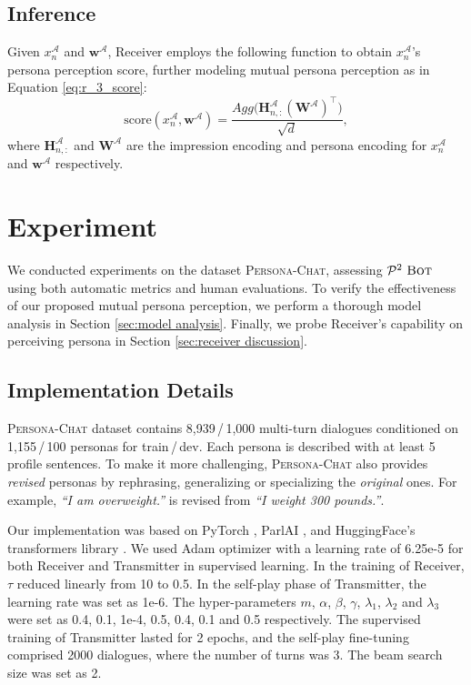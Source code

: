 \documentclass[11pt,a4paper]{article}
\begin{document}
\subsection{Inference}

Given $x^\mathcal{A}_{n}$ and $\mathbf{w}^{\mathcal{A}}$, Receiver employs the following function to obtain $x^\mathcal{A}_{n}$'s persona perception score, further modeling mutual persona perception as in Equation \ref{eq:r_3_score}:
\begin{equation}
    \text{score}(x^\mathcal{A}_{n},\mathbf{w}^{\mathcal{A}})=\frac{Agg\big(\mathbf{H}^\mathcal{A}_{n,:} ({\mathbf{W}^\mathcal{A}})^\top\big)}{\sqrt{d}},
\end{equation}
where $\mathbf{H}^\mathcal{A}_{n,:}$ and ${\mathbf{W}^\mathcal{A}}$ are the impression encoding and persona encoding for $x^\mathcal{A}_{n}$ and $\mathbf{w}^{\mathcal{A}}$ respectively.

\section{Experiment}

We conducted experiments on the dataset \textsc{Persona-Chat}, assessing $\mathcal{P}^2~\textsc{Bot}$ using both automatic metrics and human evaluations. 
To verify the effectiveness of our proposed mutual persona perception, we perform a thorough model analysis in Section \ref{sec:model analysis}. Finally, we probe Receiver's capability on perceiving persona in Section \ref{sec:receiver discussion}.

\subsection{Implementation Details}

\textsc{Persona-Chat} dataset contains 8,939\,/\,1,000 multi-turn dialogues conditioned on 1,155\,/\,100 personas for train\,/\,dev. Each persona is described with at least 5 profile sentences. To make it more challenging, \textsc{Persona-Chat} also provides \textit{revised} personas by rephrasing, generalizing or specializing the \textit{original} ones. For example, \textit{``I am overweight.''} is revised from \textit{``I weight 300 pounds.''}.

Our implementation was based on PyTorch \cite{paszke2017automatic}, ParlAI \cite{miller2017parlai}, and HuggingFace's transformers library \cite{Wolf2019HuggingFacesTS}. We used Adam \cite{kingma2014adam} optimizer with a learning rate of 6.25e-5 for both Receiver and Transmitter in supervised learning. In the training of Receiver, $\tau$ reduced linearly from 10 to 0.5. In the self-play phase of Transmitter, the learning rate was set as 1e-6. The hyper-parameters $m$, $\alpha$, $\beta$, $\gamma$, $\lambda_1$, $\lambda_2$ and $\lambda_3$ were set as 0.4, 0.1, 1e-4, 0.5, 0.4, 0.1 and 0.5 respectively. The supervised training of Transmitter lasted for 2 epochs, and the self-play fine-tuning comprised 2000 dialogues, where the number of turns was 3. The beam search size was set as 2.
\end{document}
